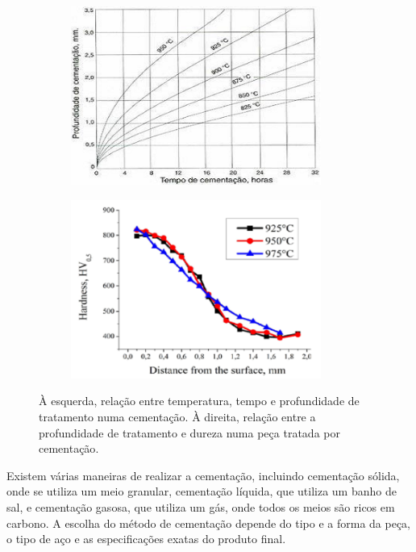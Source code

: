 \begin{figure}[htb]
    \centering
    \begin{subfigure}{.5\textwidth}
        \centering
        \includegraphics[width = 0.9\textwidth]{Figures/Cap2/Cementacao_tempo.png}
        \caption{}
        \label{fig:Cementacao_tempo}
    \end{subfigure}%
    \begin{subfigure}{.5\textwidth}
        \centering
        \includegraphics[width = 0.9\textwidth]{Figures/Cap2/Cementacao_temp_prof.png}
        \caption{}
        \label{fig:Cementacao_profundidade}
    \end{subfigure}
    \caption[relação entre temperatura, tempo e profundidade numa cementação]%
    {À esquerda, relação entre temperatura, tempo e profundidade de tratamento numa cementação. À direita, relação entre a profundidade de tratamento e dureza numa peça tratada por cementação\cite{Dychto2015}.}
\end{figure}
\par
Existem várias maneiras de realizar a cementação, incluindo cementação sólida, onde se utiliza um meio granular, cementação líquida, que utiliza um banho de sal, e cementação gasosa, que utiliza um gás, onde todos os meios são ricos em carbono\cite{ASM_International1991}. A escolha do método de cementação depende do tipo e a forma da peça, o tipo de aço e as especificações exatas do produto final.
